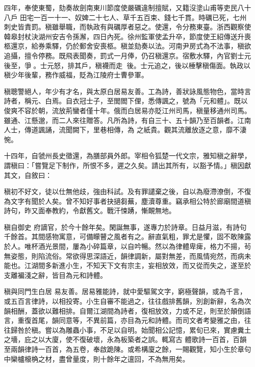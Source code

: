 \begin{pinyinscope}
 四年，奉使東蜀，劾奏故劍南東川節度使嚴礪違制擅賦，又籍沒塗山甫等吏民八十八戶
 田宅一百一十一、奴婢二十七人、草千五百束、錢七千貫。時礪已死，七州刺史皆責罰。稹雖舉職，而執政有與礪厚者惡之。使還，令分務東臺。浙西觀察使韓皋封杖決湖州安吉令孫澥，四日內死。徐州監軍使孟升卒，節度使王紹傳送升喪柩還京，給券乘驛，仍於郵舍安喪柩。稹並劾奏以法。河南尹房式為不法事，稹欲追攝，擅令停務。既飛表聞奏，罰式一月俸，仍召稹還京。宿敷水驛，內官劉士元後至，爭。士元怒，排其戶，稹襪而走
 後。士元追之，後以棰擊稹傷面。執政以稹少年後輩，務作威福，貶為江陵府士曹參軍。



 稹聰警絕人，年少有才名，與太原白居易友善。工為詩，善狀詠風態物色，當時言詩者，稱元、白焉。自衣冠士子，至閭閻下俚，悉傳諷之，號為「元和體」。既以俊爽不容於朝，流放荊蠻者僅十年。俄而白居易亦貶江州司馬，稹量移通州司馬。雖通、江懸邈，而二人來往贈答。凡所為詩，有自三十、五十韻乃至百韻者。江南人士，傳道諷誦，流聞闕下，里巷相傳，為
 之紙貴。觀其流離放逐之意，靡不淒惋。



 十四年，自虢州長史徵還，為膳部員外郎。宰相令狐楚一代文宗，雅知稹之辭學，謂稹曰：「嘗覽足下制作，所恨不多，遲之久矣。請出其所有，以豁予情。」稹因獻其文，自敘曰：



 稹初不好文，徒以仕無他歧，強由科試。及有罪譴棄之後，自以為廢滯潦倒，不復為文字有聞於人矣。曾不知好事者抉擿芻蕪，塵瀆尊重。竊承相公特於廊廟間道稹詩句，昨又面奉教約，令獻舊文。戰汗悚踴，慚靦無地。



 稹自御史
 府謫官，於今十餘年矣。閑誕無事，遂專力於詩章。日益月滋，有詩句千餘首。其間感物寓意，可備矇瞽之風者有之。辭直氣粗，罪尤是懼，固不敢陳露於人。唯杯酒光景間，屢為小碎篇章，以自吟暢。然以為律體卑痺，格力不揚，茍無姿態，則陷流俗。常欲得思深語近，韻律調新，屬對無差，而風情宛然，而病未能也。江湖間多新進小生，不知天下文有宗主，妄相放效，而又從而失之，遂至於支離褊淺之辭，皆目為元和詩體。



 稹與同門生白居
 易友善。居易雅能詩，就中愛驅駕文字，窮極聲韻，或為千言，或五百言律詩，以相投寄。小生自審不能過之，往往戲排舊韻，別創新辭，名為次韻相酬，蓋欲以難相排。自爾江湖間為詩者，復相放效，力或不足，則至於顛倒語言，重復首尾，韻同意等，不異前篇，亦目為元和詩體。而司文者考變雅之由，往往歸咎於稹。嘗以為雕蟲小事，不足以自明。始聞相公記憶，累旬已來，實慮糞土之墻，庇之以大廈，使不復破壞，永為板築者之誤。輒寫古
 體歌詩一百首，百韻至兩韻律詩一百首，為五卷，奉啟跪陳。或希構廈之餘，一賜觀覽，知小生於章句中欒櫨榱桷之材，盡曾量度，則十餘年之邅回，不為無用矣。




\end{pinyinscope}
